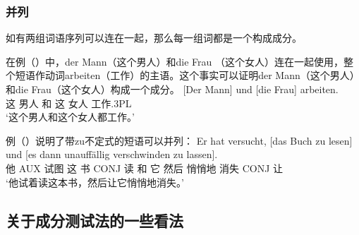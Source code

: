 \subsubsection{并列}

如有两组词语序列可以连在一起，那么每一组词都是一个构成成分。

在例（）中，der Mann（这个男人）和die Frau （这个女人）连在一起使用，整个短语作动词arbeiten（工作）的主语。这个事实可以证明der Mann（这个男人）和die Frau（这个女人）构成一个成分。
\ea
\gll {}[Der        Mann] und [die          Frau] arbeiten.\\
     \spacebr{}这 男人   和 \spacebr{}这 女人 工作.3PL\\
\glt `这个男人和这个女人都工作。'
\z

例（）说明了带zu不定式的短语可以并列：
\ea
\gll Er hat versucht, [das Buch zu lesen] und [es dann unauffällig verschwinden zu lassen].\\
     他 AUX 试图 \spacebr{}这 书 CONJ 读 和 \spacebr{}它 然后 悄悄地 消失 CONJ 让\\
\glt `他试着读这本书，然后让它悄悄地消失。'
\z

\subsection{关于成分测试法的一些看法}
\label{sec-status-der-ktests}

